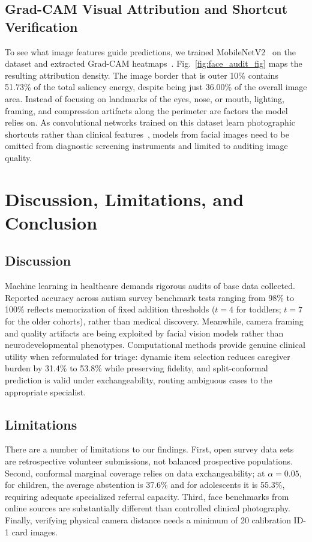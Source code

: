 \documentclass[conference]{IEEEtran}
\begin{document}
\subsection{Grad-CAM Visual Attribution and Shortcut Verification}

To see what image features guide predictions, we trained MobileNetV2~\cite{sandler2018mobilenetv2} on the dataset and extracted Grad-CAM heatmaps~\cite{selvaraju2017grad}. Fig.~\ref{fig:face_audit_fig} maps the resulting attribution density. The image border that is outer 10\% contains 51.73\% of the total saliency energy, despite being just 36.00\% of the overall image area. Instead of focusing on landmarks of the eyes, nose, or mouth, lighting, framing, and compression artifacts along the perimeter are factors the model relies on. As convolutional networks trained on this dataset learn photographic shortcuts rather than clinical features~\cite{geirhos2020shortcut}, models from facial images need to be omitted from diagnostic screening instruments and limited to auditing image quality.

\section{Discussion, Limitations, and Conclusion}

\subsection{Discussion}
Machine learning in healthcare demands rigorous audits of base data collected. Reported accuracy across autism survey benchmark tests ranging from 98\% to 100\% reflects memorization of fixed addition thresholds ($t = 4$ for toddlers; $t = 7$ for the older cohorts), rather than medical discovery. Meanwhile, camera framing and quality artifacts are being exploited by facial vision models rather than neurodevelopmental phenotypes. Computational methods provide genuine clinical utility when reformulated for triage: dynamic item selection reduces caregiver burden by 31.4\% to 53.8\% while preserving fidelity, and split-conformal prediction is valid under exchangeability, routing ambiguous cases to the appropriate specialist.

\subsection{Limitations}
There are a number of limitations to our findings. First, open survey data sets are retrospective volunteer submissions, not balanced prospective populations. Second, conformal marginal coverage relies on data exchangeability; at $\alpha = 0.05$, for children, the average abstention is 37.6\% and for adolescents it is 55.3\%, requiring adequate specialized referral capacity. Third, face benchmarks from online sources are substantially different than controlled clinical photography. Finally, verifying physical camera distance needs a minimum of 20 calibration ID-1 card images.
\end{document}
